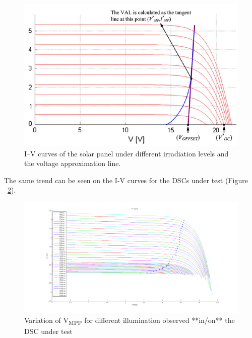 { \begin{figure}[H]
  \begin{center}
  \includegraphics[width=\textwidth]{images/IVCurve_lui}
  \caption{I–V curves of the solar panel under different irradiation levels and the voltage approximation line. \cite{liu2011fast} }
  \label{fig:Lui_IV_1}
  \end{center}
  \end{figure}
  
  The same trend can be seen on the I-V curves for the \ac{DSCs} under test (Figure ~\ref{fig:vmmp_lux50_5000}).
   \begin{figure}[H]
    \begin{center}
    \includegraphics[width=\textwidth]{images/IV_50-500}
    \caption{Variation of V\textsubscript{MPP} for different illumination observed **in/on** the DSC under test }
    \label{fig:vmmp_lux50_5000}
    \end{center}
    \end{figure}
  

}
